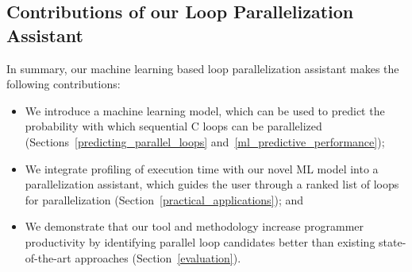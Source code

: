 \subsection{Contributions of our Loop Parallelization Assistant}
\quad In summary, our machine learning based loop parallelization assistant makes the following contributions:
\begin{itemize}[style=unboxed,leftmargin=0cm]
\itemsep0em
\renewcommand\labelitemi{$\vartriangleright$}
\renewcommand\labelitemii{$\bullet$}
\item We introduce a machine learning model, which can be used to predict the probability with which sequential C loops can be parallelized (Sections~\ref{predicting_parallel_loops} and~\ref{ml_predictive_performance});
\item We integrate profiling of execution time with our novel ML model into a parallelization assistant, which guides the user through a ranked list of loops for parallelization (Section~\ref{practical_applications}); and
\item We demonstrate that our tool and methodology increase programmer productivity by identifying parallel loop candidates better than existing state-of-the-art approaches (Section~\ref{evaluation}).
\end{itemize}

